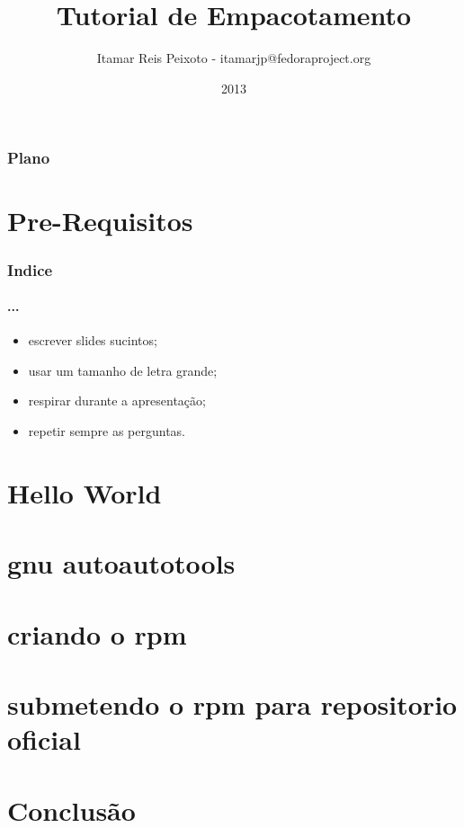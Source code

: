 \documentclass[14pt]{beamer}
\title{Tutorial de Empacotamento}
\author{Itamar Reis Peixoto - itamarjp@fedoraproject.org}
\institute{Fedora Project}
\date{2013}
\begin{document}
\begin{frame}
\maketitle
\end{frame}

\begin{frame}
\frametitle{Plano}
\tableofcontents
\end{frame}



\section{Pre-Requisitos}

\begin{frame}
\frametitle{Indice}

\framesubtitle{...}
\begin{itemize}
\item escrever slides sucintos;
\item usar um tamanho de letra grande;
\item respirar durante a apresentação;
\item repetir sempre as perguntas.
\end{itemize}
\end{frame}

\section{Hello World}

\section{gnu autoautotools}

\section{criando o rpm}

\section{submetendo o rpm para repositorio oficial}

\section{Conclusão}
\end{document}
